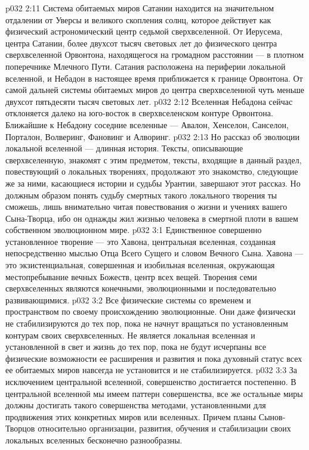 \vs p032 2:11 Система обитаемых миров Сатании находится на значительном отдалении от Уверсы и великого скопления солнц, которое действует как физический астрономический центр седьмой сверхвселенной. От Иерусема, центра Сатании, более двухсот тысяч световых лет до физического центра сверхвселенной Орвонтона, находящегося на громадном расстоянии --- в плотном поперечнике Млечного Пути. Сатания расположена на периферии локальной вселенной, и Небадон в настоящее время приближается к границе Орвонтона. От самой дальней системы обитаемых миров до центра сверхвселенной чуть меньше двухсот пятьдесяти тысяч световых лет.
\vs p032 2:12 Вселенная Небадона сейчас отклоняется далеко на юго\hyp{}восток в сверхвселенском контуре Орвонтона. Ближайшие к Небадону соседние вселенные --- Авалон, Хенселон, Санселон, Порталон, Волверинг, Фановинг и Алворинг.
\vs p032 2:13 \pc Но рассказ об эволюции локальной вселенной --- длинная история. Тексты, описывающие сверхвселенную, знакомят с этим предметом, тексты, входящие в данный раздел, повествующий о локальных творениях, продолжают это знакомство, следующие же за ними, касающиеся истории и судьбы Урантии, завершают этот рассказ. Но должным образом понять судьбу смертных такого локального творения ты сможешь, лишь внимательно читая повествования о жизни и учениях вашего Сына\hyp{}Творца, ибо он однажды жил жизнью человека в смертной плоти в вашем собственном эволюционном мире.
\vs p032 3:1 Единственное совершенно установленное творение --- это Хавона, центральная вселенная, созданная непосредственно мыслью Отца Всего Сущего и словом Вечного Сына. Хавона --- это экзистенциальная, совершенная и изобильная вселенная, окружающая местопребывание вечных Божеств, центр всех вещей. Творения семи сверхвселенных являются конечными, эволюционными и последовательно развивающимися.
\vs p032 3:2 Все физические системы со временем и пространством по своему происхождению эволюционные. Они даже физически не стабилизируются до тех пор, пока не начнут вращаться по установленным контурам своих сверхвселенных. Не является локальная вселенная и установленной в свет и жизнь до тех пор, пока не будут исчерпаны все физические возможности ее расширения и развития и пока духовный статус всех ее обитаемых миров навсегда не установится и не стабилизируется.
\vs p032 3:3 За исключением центральной вселенной, совершенство достигается постепенно. В центральной вселенной мы имеем паттерн совершенства, все же остальные миры должны достигать такого совершенства методами, установленными для продвижения этих конкретных миров или вселенных. Причем планы Сынов\hyp{}Творцов относительно организации, развития, обучения и стабилизации своих локальных вселенных бесконечно разнообразны.
